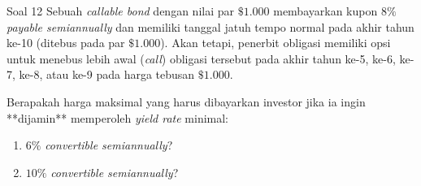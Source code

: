\documentclass[11pt,a4paper]{article}
\begin{document}
\vspace{1.2em}

\begin{problembox}{Soal 12}
Sebuah \textit{callable bond} dengan nilai par $\$1.000$ membayarkan kupon $8\%$ \textit{payable semiannually} dan memiliki tanggal jatuh tempo normal pada akhir tahun ke-10 (ditebus pada par $\$1.000$). Akan tetapi, penerbit obligasi memiliki opsi untuk menebus lebih awal (\textit{call}) obligasi tersebut pada akhir tahun ke-5, ke-6, ke-7, ke-8, atau ke-9 pada harga tebusan $\$1.000$.

Berapakah harga maksimal yang harus dibayarkan investor jika ia ingin **dijamin** memperoleh \textit{yield rate} minimal:
\begin{enumerate}[label=(\alph*)]
    \item $6\%$ \textit{convertible semiannually}?
    \item $10\%$ \textit{convertible semiannually}?
\end{enumerate}
\end{problembox}
\end{document}
